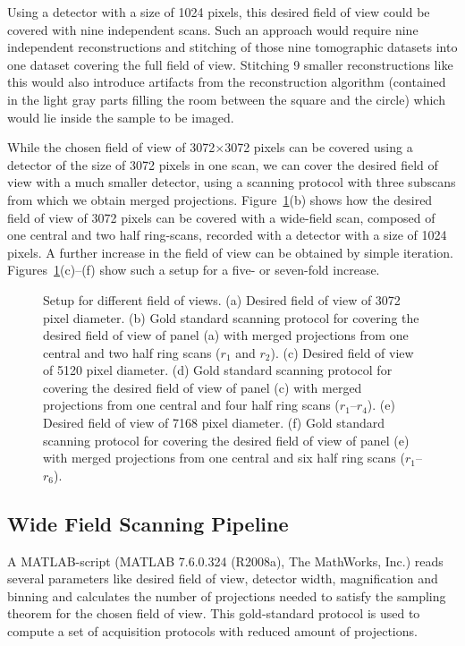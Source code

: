 Using a detector with a size of 1024 pixels, this desired field of view could be covered with nine independent scans. Such an approach would require nine independent reconstructions and stitching of those nine tomographic datasets into one dataset covering the full field of view. Stitching 9 smaller reconstructions like this would also introduce artifacts from the reconstruction algorithm (contained in the light gray parts filling the room between the square and the circle) which would lie inside the sample to be imaged.

While the chosen field of view of 3072$\times$3072 pixels can be covered using a detector of the size of 3072 pixels in one scan, we can cover the desired field of view with a much smaller detector, using a scanning protocol with three subscans from which we obtain merged projections. Figure~\ref{fig:SubScan-Setup}(b) shows how the desired field of view of 3072 pixels can be covered with a wide-field scan, composed of one central and two half ring-scans, recorded with a detector with a size of 1024 pixels. A further increase in the field of view can be obtained by simple iteration. Figures~\ref{fig:SubScan-Setup}(c)--(f) show such a setup for a five- or seven-fold increase.

\begin{figure}
	\centering
	\caption{Setup for different field of views. %
		(a) Desired field of view of 3072 pixel diameter. %
		(b) Gold standard scanning protocol for covering the desired field of view of panel (a) with merged projections from one central and two half ring scans ($r_{1}$ and $r_{2}$). %
		(c) Desired field of view of 5120 pixel diameter. %
		(d) Gold standard scanning protocol for covering the desired field of view of panel (c) with merged projections from one central and four half ring scans ($r_{1}$--$r_{4}$). %
		(e) Desired field of view of 7168 pixel diameter. %
		(f) Gold standard scanning protocol for covering the desired field of view of panel (e) with merged projections from one central and six half ring scans ($r_{1}$--$r_{6}$).}%
	\ifiucr		
		
	\else
	\fi
	\label{fig:SubScan-Setup}
\end{figure}

\subsection{Wide Field Scanning Pipeline}
\label{subsec:wfs-setup}
A MATLAB-script (MATLAB\textsuperscript{\textregistered} 7.6.0.324 (R2008a), The MathWorks, Inc.) reads several parameters like desired field of view, detector width, magnification and binning and calculates the number of projections needed to satisfy the sampling theorem for the chosen field of view. This gold-standard protocol is used to compute a set of acquisition protocols with reduced amount of projections.

